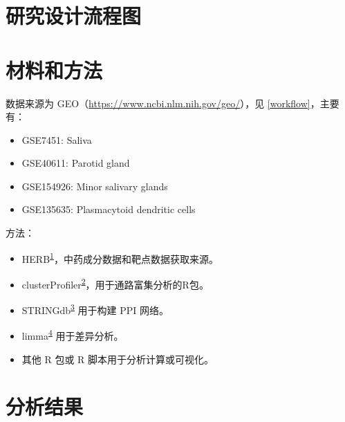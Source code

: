 \documentclass[
]{article}
\providecommand{\tightlist}{%
  \setlength{\itemsep}{0pt}\setlength{\parskip}{0pt}}
\begin{document}
\hypertarget{route}{%
\section{研究设计流程图}\label{route}}

\hypertarget{methods}{%
\section{材料和方法}\label{methods}}

数据来源为 GEO（\url{https://www.ncbi.nlm.nih.gov/geo/}），见 \ref{workflow}，主要有：

\begin{itemize}
\tightlist
\item
  GSE7451: Saliva
\item
  GSE40611: Parotid gland
\item
  GSE154926: Minor salivary glands
\item
  GSE135635: Plasmacytoid dendritic cells
\end{itemize}

方法：

\begin{itemize}
\tightlist
\item
  HERB\textsuperscript{\protect\hyperlink{ref-HerbAHighThFang2021}{1}}，中药成分数据和靶点数据获取来源。
\item
  clusterProfiler\textsuperscript{\protect\hyperlink{ref-ClusterprofilerWuTi2021}{2}}，用于通路富集分析的R包。
\item
  STRINGdb\textsuperscript{\protect\hyperlink{ref-TheStringDataSzklar2021}{3}} 用于构建 PPI 网络。
\item
  limma\textsuperscript{\protect\hyperlink{ref-LimmaPowersDiRitchi2015}{4}} 用于差异分析。
\item
  其他 R 包或 R 脚本用于分析计算或可视化。
\end{itemize}

\hypertarget{results}{%
\section{分析结果}\label{results}}
\end{document}
